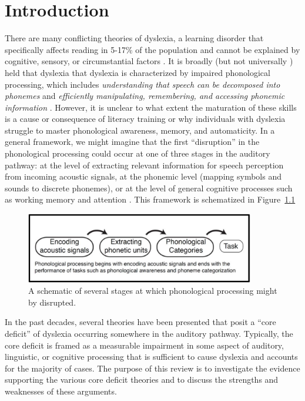 \documentclass[../uwthesis.tex]{subfiles}
\begin{document}
\chapter {Introduction}
 
There are many conflicting theories of dyslexia, a learning disorder that specifically affects reading in 5-17\% of the population and cannot be explained by cognitive, sensory, or circumstantial factors \cite{Shaywitz1998Dyslexia.,Snowling2000DyslexiaEdition}. It is broadly (but not universally \cite{Ramus2008WhatDeficit,Pennington2012IndividualModels.}) held that dyslexia that dyslexia is characterized by impaired phonological processing, which includes \textit{understanding that speech can be decomposed into phonemes} and \textit{efficiently manipulating, remembering, and accessing phonemic information} \cite{Wagner1987TheSkills,Snowling1998DyslexiaImplications}. However, it is unclear to what extent the maturation of these skills is a cause or consequence of literacy training or why individuals with dyslexia struggle to master phonological awareness, memory, and automaticity. In a general framework, we might imagine that the first
“disruption” in the phonological processing could occur at one of three stages in the auditory pathway: at the level of extracting relevant information for speech perception from incoming acoustic signals, at the phonemic level (mapping symbols and sounds to discrete phonemes), or at the level of general cognitive processes such as working memory and attention \cite{Serniclaes2004AllophonicDyslexia}. This framework is schematized in Figure~\ref{fig:intro_1}

\begin{figure}
    \centering
    \caption{A schematic of several stages at which phonological processing might by disrupted.}
    \label{fig:intro_1}
    \includegraphics[width=10cm]{images/intro/intro_fig1.png}
\end{figure}
 
In the past decades, several theories have been presented that posit a “core deficit” of dyslexia occurring somewhere in the auditory pathway. Typically, the core deficit is framed as a measurable impairment in some aspect of auditory, linguistic, or cognitive processing that is sufficient to cause dyslexia and accounts for the majority of cases. The purpose of this review is to investigate the evidence supporting the various core deficit theories and to discuss the strengths and weaknesses of these arguments.
\end{document}
